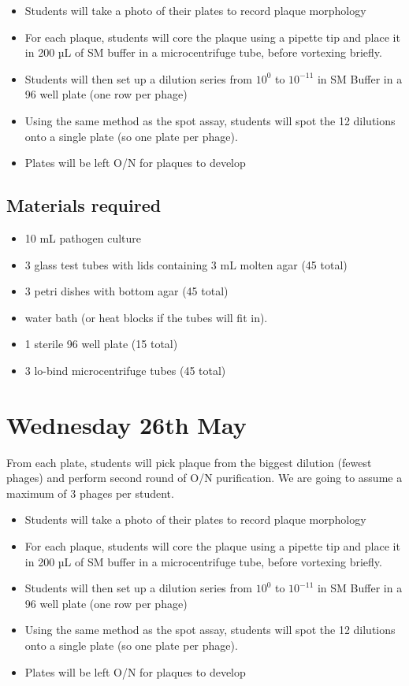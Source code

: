 \documentclass[
]{book}
\providecommand{\tightlist}{%
  \setlength{\itemsep}{0pt}\setlength{\parskip}{0pt}}
\begin{document}
\begin{itemize}
\tightlist
\item
  Students will take a photo of their plates to record plaque morphology
\item
  For each plaque, students will core the plaque using a pipette tip and place it in 200 µL of SM buffer in a microcentrifuge tube, before vortexing briefly.
\item
  Students will then set up a dilution series from \(10^{0}\) to \(10^{-11}\) in SM Buffer in a 96 well plate (one row per phage)
\item
  Using the same method as the spot assay, students will spot the 12 dilutions onto a single plate (so one plate per phage).
\item
  Plates will be left O/N for plaques to develop
\end{itemize}

\hypertarget{materials-required-1}{%
\subsection{Materials required}\label{materials-required-1}}

\begin{itemize}
\tightlist
\item
  10 mL pathogen culture
\item
  3 glass test tubes with lids containing 3 mL molten agar (45 total)
\item
  3 petri dishes with bottom agar (45 total)
\item
  water bath (or heat blocks if the tubes will fit in).
\item
  1 sterile 96 well plate (15 total)
\item
  3 lo-bind microcentrifuge tubes (45 total)
\end{itemize}

\hypertarget{wednesday-26th-may}{%
\section{Wednesday 26th May}\label{wednesday-26th-may}}

From each plate, students will pick plaque from the biggest dilution (fewest phages) and perform second round of O/N purification. We are going to assume a maximum of 3 phages per student.

\begin{itemize}
\tightlist
\item
  Students will take a photo of their plates to record plaque morphology
\item
  For each plaque, students will core the plaque using a pipette tip and place it in 200 µL of SM buffer in a microcentrifuge tube, before vortexing briefly.
\item
  Students will then set up a dilution series from \(10^{0}\) to \(10^{-11}\) in SM Buffer in a 96 well plate (one row per phage)
\item
  Using the same method as the spot assay, students will spot the 12 dilutions onto a single plate (so one plate per phage).
\item
  Plates will be left O/N for plaques to develop
\end{itemize}
\end{document}
